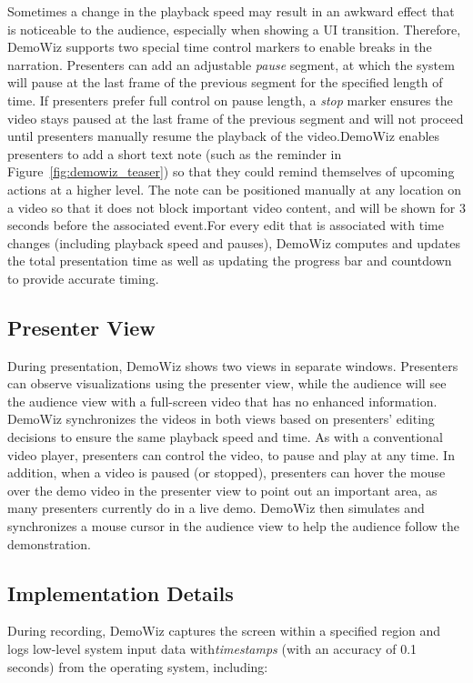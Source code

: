 Sometimes a change in the playback speed may result in an awkward effect that is noticeable to the audience, especially when showing a UI transition. Therefore, DemoWiz supports two special time control markers to enable breaks in the narration. Presenters can add an adjustable \textit{pause} segment, at which the system will pause at the last frame of the previous segment for the specified length of time. If presenters prefer full control on pause length, a \textit{stop} marker ensures the video stays paused at the last frame of the previous segment and will not proceed until presenters manually resume the playback of the video.DemoWiz enables presenters to add a short text note (such as the reminder  in Figure~\ref{fig:demowiz_teaser}) so that they could remind themselves of upcoming actions at a higher level. The note can be positioned manually at any location on a video so that it does not block important video content, and will be shown for 3 seconds before the associated event.For every edit that is associated with time changes (including playback speed and pauses), DemoWiz computes and updates the total presentation time as well as updating the progress bar and countdown to provide accurate timing.


\subsection{Presenter View}
During presentation, DemoWiz shows two views in separate windows. Presenters can observe visualizations using the presenter view, while the audience will see the audience view with a full-screen video that has no enhanced information. DemoWiz synchronizes the videos in both views based on presenters’ editing decisions to ensure the same playback speed and time. As with a conventional video player, presenters can control the video, to pause and play at any time. In addition, when a video is paused (or stopped), presenters can hover the mouse over the demo video in the presenter view to point out an important area, as many presenters currently do in a live demo. DemoWiz then simulates and synchronizes a mouse cursor in the audience view to help the audience follow the demonstration.


\subsection{Implementation Details}
During recording, DemoWiz captures the screen within a specified region and logs low-level system input data with\textit{timestamps} (with an accuracy of 0.1 seconds) from the operating system, including:

